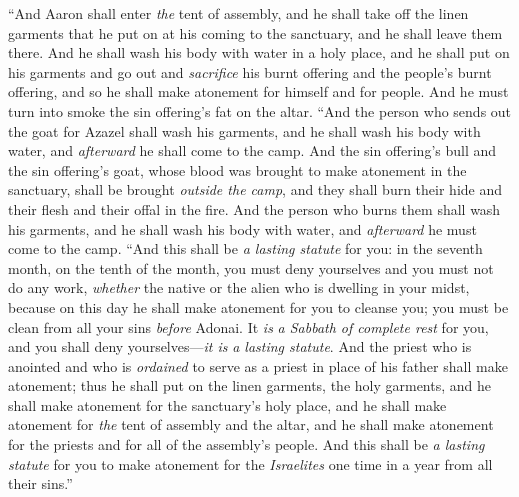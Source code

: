 \begin{biblechapter}
\verse “And Aaron shall enter \textit{the} tent of assembly, and he shall take off the linen garments that he put on at his coming to the sanctuary, and he shall leave them there.
\verse And he shall wash his body with water in a holy place, and he shall put on his garments and go out and \textit{sacrifice} his burnt offering and the people’s burnt offering, and so he shall make atonement for himself and for people.
\verse And he must turn into smoke the sin offering’s fat on the altar.
\verse “And the person who sends out the goat for Azazel shall wash his garments, and he shall wash his body with water, and \textit{afterward} he shall come to the camp.
\verse And the sin offering’s bull and the sin offering’s goat, whose blood was brought to make atonement in the sanctuary, shall be brought \textit{outside the camp}, and they shall burn their hide and their flesh and their offal in the fire.
\verse And the person who burns them shall wash his garments, and he shall wash his body with water, and \textit{afterward} he must come to the camp.
\verse “And this shall be \textit{a lasting statute} for you: in the seventh month, on the tenth of the month, you must deny yourselves and you must not do any work, \textit{whether} the native or the alien who is dwelling in your midst,
\verse because on this day he shall make atonement for you to cleanse you; you must be clean from all your sins \textit{before} Adonai.
\verse It \textit{is} \textit{a Sabbath of complete rest} for you, and you shall deny yourselves—\textit{it is} \textit{a lasting statute}.
\verse And the priest who is anointed and who is \textit{ordained} to serve as a priest in place of his father shall make atonement; thus he shall put on the linen garments, the holy garments,
\verse and he shall make atonement for the sanctuary’s holy place, and he shall make atonement for \textit{the} tent of assembly and the altar, and he shall make atonement for the priests and for all of the assembly’s people.
\verse And this shall be \textit{a lasting statute} for you to make atonement for the \textit{Israelites} one time in a year from all their sins.”
\end{biblechapter}

